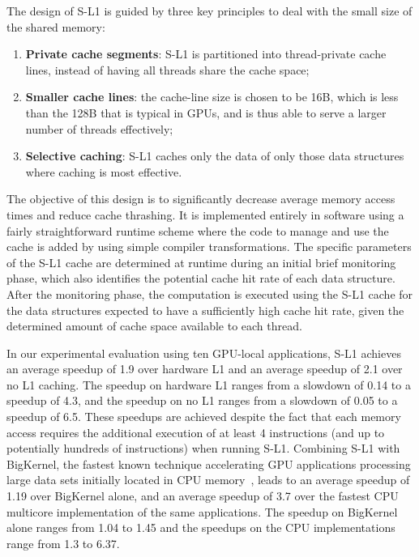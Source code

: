 The design of S-L1 is guided by three key principles to deal with the small size of
the shared memory:
\begin{enumerate}
\item {\bf Private cache segments}: S-L1 is partitioned into thread-private cache lines,
instead of having all threads share the cache space; 
\item {\bf Smaller cache lines}: the cache-line size is chosen to be 16B, which is less than the 128B that is typical in GPUs, and is thus able to serve a larger number of threads effectively;
\item {\bf Selective caching}: S-L1 caches only the data of only those data structures where caching is most effective.
\end{enumerate}
The objective of this design is to significantly decrease average memory access times and reduce 
cache thrashing. 
It is implemented entirely in software using a fairly straightforward runtime scheme where the code
to manage and use the cache is added by using simple compiler transformations.
The specific parameters of the S-L1 cache are determined at runtime during an initial brief
monitoring phase, which also identifies the potential cache hit rate of each data structure.
After the monitoring phase, the computation is executed using the S-L1 cache for the data structures expected to have a sufficiently
high cache hit rate, given the determined amount of cache space available to each thread.

In our experimental evaluation using ten GPU-local applications, S-L1 achieves an average speedup of 1.9 over hardware L1 and an average speedup of 2.1
over no L1 caching. The speedup on hardware L1 ranges from a slowdown of 0.14 to a speedup of 4.3, and the speedup on no L1
ranges from a slowdown of 0.05 to a speedup of 6.5. These speedups are achieved despite the fact that each memory access requires the additional
execution of at least 4 instructions (and up to potentially hundreds of instructions) when running S-L1.
Combining S-L1 with BigKernel, the fastest known technique accelerating GPU applications processing
large data sets initially located in CPU memory~\cite{mokhtari2014bigkernel}, leads to an average speedup of 1.19 over BigKernel alone,
and an average speedup of 3.7 over the fastest CPU multicore implementation
of the same applications. The speedup on BigKernel alone ranges from 1.04 to 1.45 and the speedups on the CPU implementations range from
1.3 to 6.37.

\vspace{0.3cm}

